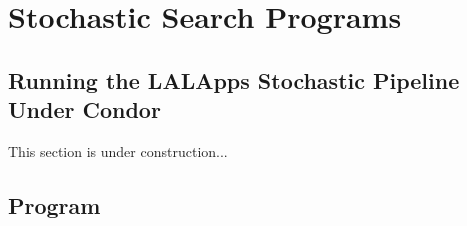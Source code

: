 
\chapter{Stochastic Search Programs}
\label{chapter:stochastic}

\clearpage


\clearpage
\section{Running the LALApps Stochastic Pipeline Under Condor}

This section is under construction...

\clearpage
\section{Program }
\label{program:lalapps-stochastic-pipe}

